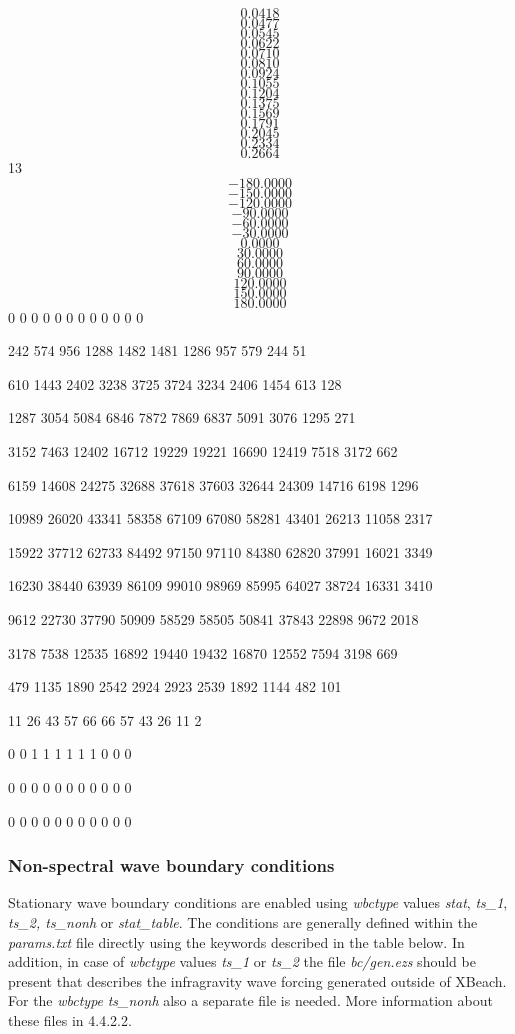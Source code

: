 \documentclass{article}
\begin{document}
\[0.0418\] 
\[0.0477\] 
\[0.0545\] 
\[0.0622\] 
\[0.0710\] 
\[0.0810\] 
\[0.0924\] 
\[0.1055\] 
\[0.1204\] 
\[0.1375\] 
\[0.1569\] 
\[0.1791\] 
\[0.2045\] 
\[0.2334\] 
\[0.2664\] 
13 
\[-180.0000\] 
\[-150.0000\] 
\[-120.0000\] 
\[-90.0000\] 
\[-60.0000\] 
\[-30.0000\] 
\[0.0000\] 
\[30.0000\] 
\[60.0000\] 
\[90.0000\] 
\[120.0000\] 
\[150.0000\] 
\[180.0000\] 
   0     0     0     0     0     0     0     0     0     0     0     0

   242   574   956  1288  1482  1481  1286   957   579   244    51

   610  1443  2402  3238  3725  3724  3234  2406  1454   613   128

  1287  3054  5084  6846  7872  7869  6837  5091  3076  1295   271

  3152  7463 12402 16712 19229 19221 16690 12419  7518  3172   662

  6159 14608 24275 32688 37618 37603 32644 24309 14716  6198  1296

 10989 26020 43341 58358 67109 67080 58281 43401 26213 11058  2317

 15922 37712 62733 84492 97150 97110 84380 62820 37991 16021  3349

 16230 38440 63939 86109 99010 98969 85995 64027 38724 16331  3410

  9612 22730 37790 50909 58529 58505 50841 37843 22898  9672  2018

  3178  7538 12535 16892 19440 19432 16870 12552  7594  3198   669

   479  1135  1890  2542  2924  2923  2539  1892  1144   482   101

    11    26    43    57    66    66    57    43    26    11     2

     0     0     1     1     1     1     1     1     0     0     0

     0     0     0     0     0     0     0     0     0     0     0

     0     0     0     0     0     0     0     0     0     0     0


\subsubsection{ Non-spectral wave boundary conditions}

\noindent Stationary wave boundary conditions are enabled using \textit{wbctype} values \textit{stat}, \textit{ts\_1}, \textit{ts\_2, ts\_nonh }or \textit{stat\_table}. The conditions are\textit{ }generally defined within the \textit{params.txt} file directly using the keywords described in the table below. In addition, in case of \textit{wbctype} values \textit{ts\_1} or \textit{ts\_2} the file \textit{bc/gen.ezs} should be present that describes the infragravity wave forcing generated outside of XBeach. For the \textit{wbctype} \textit{ts\_nonh }also a separate file is needed. More information about these files in 4.4.2.2. 
\end{document}

